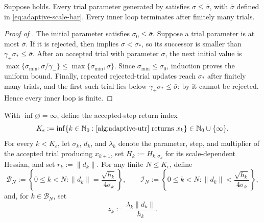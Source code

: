 \documentclass{article}
\begin{document}
\begin{corollary}\label{cor:adaptive-scale-bound}
Suppose  holds.  Every trial parameter
generated by  satisfies
$\sigma\le\bar\sigma$, with $\bar\sigma$ defined in
\eqref{eq:adaptive-scale-bar}.  Every inner loop terminates after
finitely many trials.
\end{corollary}

\begin{proof}[Proof of ]
The initial parameter satisfies $\sigma_0\le\bar\sigma$.  Suppose a
trial parameter is at most $\bar\sigma$.  If it is rejected, then
 implies $\sigma<\sigma_*$, so its successor is
smaller than $\gamma_+\sigma_*\le\bar\sigma$.  After an accepted trial
with parameter $\sigma$, the next initial value is
$\max\{\sigma_{\min},\sigma/\gamma_-\}
 \le\max\{\sigma_{\min},\sigma\}$.  Since $\sigma_{\min}\le\sigma_0$,
induction proves the uniform bound.  Finally, repeated rejected-trial
updates reach $\sigma_*$ after finitely many trials, and the first such
trial lies below $\gamma_+\sigma_*\le\bar\sigma$; by
 it cannot be rejected.  Hence every inner loop
is finite.
\end{proof}

With $\inf\varnothing=\infty$, define the accepted-step return index
\begin{equation}\label{eq:adaptive-stopping-time}
 K_\epsilon:=\inf\{k\in\mathbb N_0:
  \text{\Cref{alg:adaptive-utr} returns }x_k\}
 \in\mathbb N_0\cup\{\infty\}.
\end{equation}
For every $k<K_\epsilon$, let $\sigma_k$, $d_k$, and $\lambda_k$
denote the parameter, step, and multiplier of the accepted trial
producing $x_{k+1}$, set $H_k:=H_{k,\sigma_k}$ for its
scale-dependent Hessian, and set $r_k:=\|d_k\|$.
For any finite $N\le K_\epsilon$, define
\begin{equation}\label{eq:adaptive-prefix-sets}
 \mathcal B_N:=\left\{0\le k<N:
  \|d_k\|=\frac{\sqrt{h_k}}{4\sigma_k}\right\},
 \qquad
 \mathcal I_N:=\left\{0\le k<N:
  \|d_k\|<\frac{\sqrt{h_k}}{4\sigma_k}\right\},
\end{equation}
and, for $k\in\mathcal B_N$, set
\begin{equation}\label{eq:z-def}
 z_k:=\frac{\lambda_k\|d_k\|}{h_k}.
\end{equation}
\end{document}
